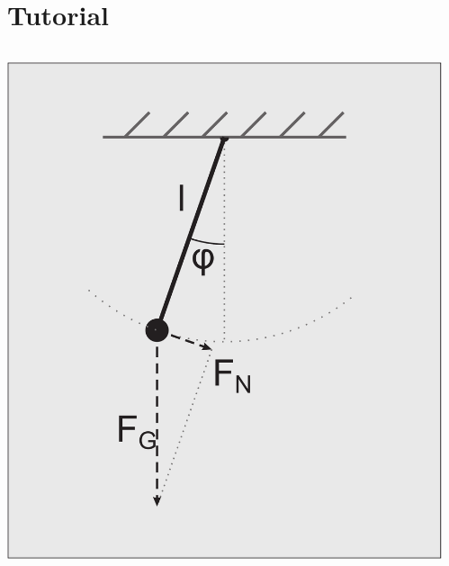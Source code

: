 \section{Tutorial}

\begin{frame}
  \tableofcontents[currentsection] 
\end{frame}


\begin{frame}[fragile]


\vspace{2ex}

\begin{columns}[T]
  \begin{column}{0.35\textwidth}
    \includegraphics[draft=false,width=1.0\textwidth]{pendulum.pdf}

   \vspace{4ex}
  \end{column}

  \begin{column}{0.65\textwidth}
\end{column}
\end{columns}
\end{frame}
